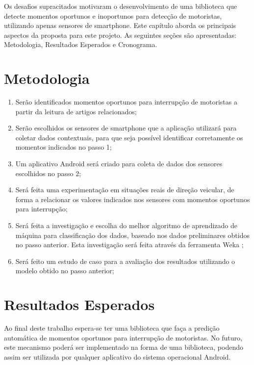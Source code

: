 \label{proposta}
Os desafios supracitados motivaram o desenvolvimento de uma biblioteca que detecte momentos oportunos
e inoportunos para detecção de motoristas, utilizando apenas sensores de smartphone.
Este capítulo aborda os principais aspectos da proposta para este projeto. As seguintes seções são apresentadas:
Metodologia, Resultados Esperados e Cronograma.

\section{Metodologia}
\label{metodologia}

\begin{enumerate}
  \item Serão identificados momentos oportunos para interrupção de motoristas a partir da leitura de artigos
relacionados;
  \item Serão escolhidos os sensores de smartphone que a aplicação utilizará para coletar dados contextuais, para
que seja possível identificar corretamente os momentos indicados no passo 1;
  \item Um aplicativo Android será criado para coleta de dados dos sensores escolhidos no passo 2;
  \item Será feita uma experimentação em situações reais de direção veicular, de forma a relacionar os valores indicados
nos sensores com momentos oportunos para interrupção;
  \item Será feita a investigação e escolha do melhor algoritmo de aprendizado de máquina para classificação dos dados,
baseado nos dados preliminares obtidos no passo anterior. Esta investigação será feita através da ferramenta Weka
\cite{hall2009weka};
  \item Será feito um estudo de caso para a avaliação dos resultados utilizando o modelo obtido no passo anterior;
\end{enumerate}

\section{Resultados Esperados}
\label{resultados}

Ao final deste trabalho espera-se ter uma biblioteca que faça a predição automática de momentos oportunos para
interrupção de motoristas. No futuro, este mecanismo poderá ser implementado na forma de uma biblioteca, podendo assim
ser utilizada por qualquer aplicativo do sistema operacional Android.

